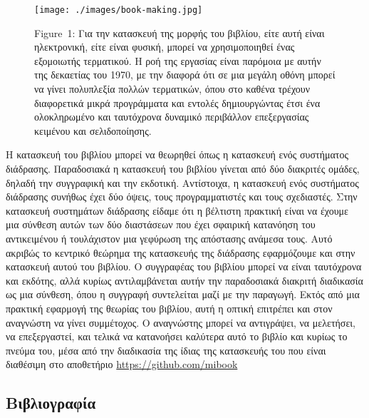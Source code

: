 \documentclass[
]{article}
\newlength{\cslhangindent}
\newlength{\cslentryspacingunit} %
\newenvironment{CSLReferences}[2] %
 {%
  \setlength{\parindent}{0pt}
  \ifodd #1
  \let\oldpar\par
  \def\par{\hangindent=\cslhangindent\oldpar}
  \fi
  \setlength{\parskip}{#2\cslentryspacingunit}
 }%
 {}
\begin{document}
\leavevmode{}%
\begin{figure}
\hypertarget{fig:book-making}{%
\centering
\texttt{[image: ./images/book-making.jpg]}
\caption{Figure~1: Για την κατασκευή της μορφής του βιβλίου, είτε αυτή
είναι ηλεκτρονική, είτε είναι φυσική, μπορεί να χρησιμοποιηθεί ένας
εξομοιωτής τερματικού. Η ροή της εργασίας είναι παρόμοια με αυτήν της
δεκαετίας του 1970, με την διαφορά ότι σε μια μεγάλη οθόνη μπορεί να
γίνει πολυπλεξία πολλών τερματικών, όπου στο καθένα τρέχουν διαφορετικά
μικρά προγράμματα και εντολές δημιουργώντας έτσι ένα ολοκληρωμένο και
ταυτόχρονα δυναμικό περιβάλλον επεξεργασίας κειμένου και
σελιδοποίησης.}\label{fig:book-making}
}
\end{figure}

Η κατασκευή του βιβλίου μπορεί να θεωρηθεί όπως η κατασκευή ενός
συστήματος διάδρασης. Παραδοσιακά η κατασκευή του βιβλίου γίνεται από
δύο διακριτές ομάδες, δηλαδή την συγγραφική και την εκδοτική.
Αντίστοιχα, η κατασκευή ενός συστήματος διάδρασης συνήθως έχει δύο
όψεις, τους προγραμματιστές και τους σχεδιαστές. Στην κατασκευή
συστημάτων διάδρασης είδαμε ότι η βέλτιστη πρακτική είναι να έχουμε μια
σύνθεση αυτών των δύο διαστάσεων που έχει σφαιρική κατανόηση του
αντικειμένου ή τουλάχιστον μια γεφύρωση της απόστασης ανάμεσα τους. Αυτό
ακριβώς το κεντρικό θεώρημα της κατασκευής της διάδρασης εφαρμόζουμε και
στην κατασκευή αυτού του βιβλίου. Ο συγγραφέας του βιβλίου μπορεί να
είναι ταυτόχρονα και εκδότης, αλλά κυρίως αντιλαμβάνεται αυτήν την
παραδοσιακά διακριτή διαδικασία ως μια σύνθεση, όπου η συγγραφή
συντελείται μαζί με την παραγωγή. Εκτός από μια πρακτική εφαρμογή της
θεωρίας του βιβλίου, αυτή η οπτική επιτρέπει και στον αναγνώστη να γίνει
συμμέτοχος. Ο αναγνώστης μπορεί να αντιγράψει, να μελετήσει, να
επεξεργαστεί, και τελικά να κατανοήσει καλύτερα αυτό το βιβλίο και
κυρίως το πνεύμα του, μέσα από την διαδικασία της ίδιας της κατασκευής
του που είναι διαθέσιμη στο αποθετήριο \url{https://github.com/mibook}

\hypertarget{ux3b2ux3b9ux3b2ux3bbux3b9ux3bfux3b3ux3c1ux3b1ux3c6ux3afux3b1}{%
\subsection*{Βιβλιογραφία}\label{ux3b2ux3b9ux3b2ux3bbux3b9ux3bfux3b3ux3c1ux3b1ux3c6ux3afux3b1}}

\hypertarget{refs}{}
\begin{CSLReferences}{0}{0}
\end{CSLReferences}
\end{document}
